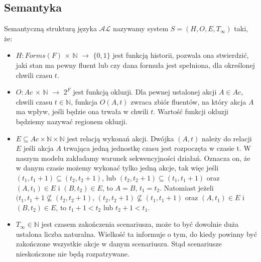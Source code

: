 \subsection{Semantyka}
\begin{definition}
Semantyczną strukturą języka $\mathcal{AL}$ nazywamy system $ S=(H,O,E,T_{\infty }) $ taki, że:
	\begin{itemize}
		\item $ H: Forms(F) $ $\times$ $ \mathbb{N}$ $\longrightarrow$ $\{0,1\}$ jest funkcją historii, pozwala ona stwierdzić, jaki stan ma pewny fluent lub czy dana formuła jest spełniona, dla określonej chwili czasu $t$.
		\item $ O: Ac$ $\times$ $ \mathbb{N}$ $\longrightarrow$ $2^{F}$ jest funkcją okluzji. Dla pewnej ustalonej akcji $A \in Ac$, chwili czasu $t\in\mathbb{N}$, funkcja $O(A,t) $ zwraca zbiór fluentów, na który akcja $A$ ma wpływ, jeśli będzie ona trwała w chwili $t$. 
Wartość funkcji okluzji będziemy nazywać regionem okluzji. 
		\item $E\subseteq Ac \times \mathbb{N} \times \mathbb{N}$ jest relacją wykonań akcji. Dwójka $(A,t)$ należy do relacji $E$ jeśli akcja $A$ trwająca jedną jednostkę czasu jest rozpoczęta w czasie t. W naszym modelu zakładamy warunek sekwencyjności działań. Oznacza on, że w danym czasie możemy wykonać tylko jedną akcje, tak więc jeśli $(t_{1},t_{1} + 1) \subseteq (t_{2},t_{2}+1)$, lub $(t_{2},t_{2}+1 ) \subseteq (t_{1},t_{1}+1) $ oraz $(A,t_{1})\in E$ i $(B,t_{2})\in E$, to $A=B$, $t_{1}=t_{2}$. Natomiast jeżeli $(t_{1},t_{1}+1 \nsubseteq (t_{2},t_{2}+1 )$, $(t_{2},t_{2}+1 ) \nsubseteq (t_{1},t_{1}+1) $ oraz $(A,t_{1})\in E$ i $(B,t_{2})\in E$, to $t_{1}+1<t_{2}$ lub $t_{2}+1<t_{1}$.
		\item $T_{\infty } \in \mathbb{N} $ jest czasem zakończenia scenariusza, może to być dowolnie duża ustalona liczba naturalna. 
		Wielkość ta informuje o tym, do kiedy powinny być zakończone wszystkie akcje w danym scenariuszu. Stąd scenariusze nieskończone nie będą rozpatrywane. 
	\end{itemize}
\end{definition}

